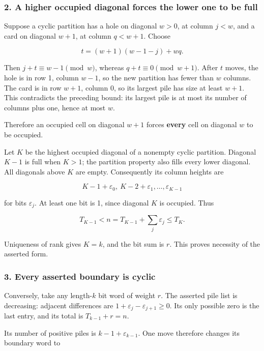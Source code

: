 \documentclass[11pt,a4paper]{article}
\begin{document}
\subsubsection{2. A higher occupied diagonal forces the lower one to be full}\label{a-higher-occupied-diagonal-forces-the-lower-one-to-be-full}

Suppose a cyclic partition has a hole on diagonal \(w>0\), at column \(j<w\), and a card on diagonal \(w+1\), at column \(q<w+1\). Choose

\[
t=(w+1)(w-1-j)+wq.
\]

Then \(j+t\equiv w-1\pmod w\), whereas \(q+t\equiv0\pmod{w+1}\). After \(t\) moves, the hole is in row 1, column \(w-1\), so the new partition has fewer than \(w\) columns. The card is in row \(w+1\), column 0, so its largest pile has size at least \(w+1\). This contradicts the preceding bound: its largest pile is at most its number of columns plus one, hence at most \(w\).

Therefore an occupied cell on diagonal \(w+1\) forces \textbf{every} cell on diagonal \(w\) to be occupied.

Let \(K\) be the highest occupied diagonal of a nonempty cyclic partition. Diagonal \(K-1\) is full when \(K>1\); the partition property also fills every lower diagonal. All diagonals above \(K\) are empty. Consequently its column heights are

\[
K-1+\varepsilon_0,\ K-2+\varepsilon_1,\ldots,\varepsilon_{K-1}
\]

for bits \(\varepsilon_j\). At least one bit is 1, since diagonal \(K\) is occupied. Thus

\[
T_{K-1}<n=T_{K-1}+\sum_j\varepsilon_j\le T_K.
\]

Uniqueness of rank gives \(K=k\), and the bit sum is \(r\). This proves necessity of the asserted form.

\subsubsection{3. Every asserted boundary is cyclic}\label{every-asserted-boundary-is-cyclic}

Conversely, take any length-\(k\) bit word of weight \(r\). The asserted pile list is decreasing: adjacent differences are \(1+\varepsilon_j-\varepsilon_{j+1}\ge0\). Its only possible zero is the last entry, and its total is \(T_{k-1}+r=n\).

Its number of positive piles is \(k-1+\varepsilon_{k-1}\). One move therefore changes its boundary word to
\end{document}
